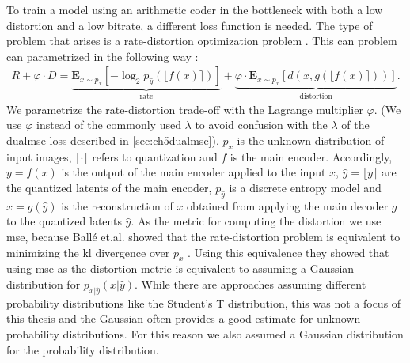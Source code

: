To train a model using an arithmetic coder in the bottleneck with both a low distortion and a low bitrate, a different loss function is needed. The type of problem that arises is a rate-distortion optimization problem \citep{balle_variational_2018}. This can problem can parametrized in the following way \citep{minnen_joint_2018}:
\begin{align}
R + \varphi \cdot D = \underbrace{\mathbf{E}_{x\sim p_x} [ -\log_2 p_{\hat{y}}(\lfloor f(x)\rceil)]}_\text{rate}+ \underbrace{\varphi \cdot\mathbf{E}_{x\sim p_x} [d(x,g(\lfloor f(x)\rceil))]}_\text{distortion}.
\end{align}
We parametrize the rate-distortion trade-off with the Lagrange multiplier $\varphi$. (We use $\varphi$ instead of the commonly used $\lambda$ to avoid confusion with the $\lambda$ of the \ac{dualmse} loss described in \autoref{sec:ch5dualmse}). $p_x$ is the unknown distribution of input images, $\lfloor\cdot\rceil$ refers to quantization and $f$ is the main encoder. Accordingly, $y=f(x)$ is the output of the main encoder applied to the input $x$, $\hat{y} = \lfloor y\rceil$ are the quantized latents of the main encoder, $p_{\hat{y}}$ is a discrete entropy model and $\hat{x}=g(\hat{y})$ is the reconstruction of $x$ obtained from applying the main decoder $g$ to the quantized latents $\hat{y}$. As the metric for computing the distortion we use \ac{mse}, because Ballé et.al. showed that the rate-distortion problem is equivalent to minimizing the \ac{kl} divergence over $p_x$ \citep{balle_variational_2018}. Using this equivalence they showed that using \ac{mse} as the distortion metric is equivalent to assuming a Gaussian distribution for $p_{x|\hat{y}}(x|\hat{y})$. While there are approaches assuming different probability distributions like the Student's T distribution, this was not a focus of this thesis and the Gaussian often provides a good estimate for unknown probability distributions. For this reason we also assumed a Gaussian distribution for the probability distribution.

